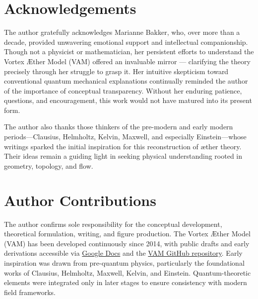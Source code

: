 \documentclass[preprint,titlepage]{revtex4-2}
\begin{document}
    \section*{Acknowledgements}

    The author gratefully acknowledges Marianne Bakker, who, over more than a decade, provided unwavering emotional support and intellectual companionship. Though not a physicist or mathematician, her persistent efforts to understand the Vortex Æther Model (VAM) offered an invaluable mirror — clarifying the theory precisely through her struggle to grasp it. Her intuitive skepticism toward conventional quantum mechanical explanations continually reminded the author of the importance of conceptual transparency. Without her enduring patience, questions, and encouragement, this work would not have matured into its present form.

    The author also thanks those thinkers of the pre-modern and early modern periods—Clausius, Helmholtz, Kelvin, Maxwell, and especially Einstein—whose writings sparked the initial inspiration for this reconstruction of æther theory. Their ideas remain a guiding light in seeking physical understanding rooted in geometry, topology, and flow.

    \section*{Author Contributions}
    The author confirms sole responsibility for the conceptual development, theoretical formulation, writing, and figure production. The Vortex Æther Model (VAM) has been developed continuously since 2014, with public drafts and early derivations accessible via \href{https://docs.google.com/document/d/1ILtqum7WZuvKa3tFXKdw666gtKORZ4X8WGsonBCLAqg}{Google Docs} and the \href{https://github.com/bg-omar/VAM}{VAM GitHub repository}. Early inspiration was drawn from pre-quantum physics, particularly the foundational works of Clausius, Helmholtz, Maxwell, Kelvin, and Einstein. Quantum-theoretic elements were integrated only in later stages to ensure consistency with modern field frameworks.

    
    
\end{document}
